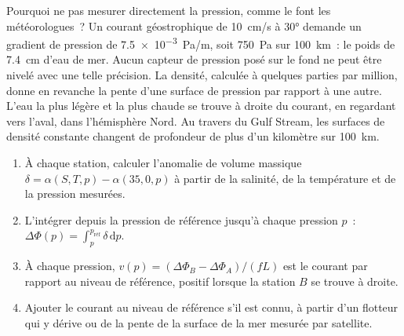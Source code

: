 Pourquoi ne pas mesurer directement la pression, comme le font les
météorologues~? Un courant géostrophique de \qty{10}{cm/s} à \ang{30}
demande un gradient de pression de \qty{7.5e-3}{Pa/m}, soit \qty{750}{Pa}
sur \qty{100}{km}~: le poids de \qty{7.4}{cm} d'eau de mer. Aucun capteur
de pression posé sur le fond ne peut être nivelé avec une telle précision. La
densité, calculée à quelques parties par million, donne en revanche la pente
d'une surface de pression par rapport à une autre. L'eau la plus légère et
la plus chaude se trouve à droite du courant, en regardant vers l'aval, dans l'hémisphère Nord. Au travers du Gulf Stream, les surfaces de
densité constante changent de profondeur de plus d'un kilomètre sur \qty{100}{km}.

\begin{method}\label{met:b3:ocean-dynamics:dynamic}
\begin{enumerate}
\item À chaque station, calculer l'anomalie de volume massique $\delta =
  \alpha(S, T, p) - \alpha(35, 0, p)$ à partir de la salinité, de la
  température et de la pression mesurées.
\item L'intégrer depuis la pression de référence jusqu'à chaque pression $p$~:
  $\Delta\Phi(p) = \int_p^{p_{\text{réf}}}\delta\,\mathrm dp$.
\item À chaque pression, $v(p) = (\Delta\Phi_B - \Delta\Phi_A)/(fL)$ est
  le courant par rapport au niveau de référence, positif lorsque la station $B$
  se trouve à droite.
\item Ajouter le courant au niveau de référence s'il est connu, à partir d'un
  flotteur qui y dérive ou de la pente de la surface de la mer mesurée par satellite.
\end{enumerate}
\end{method}

